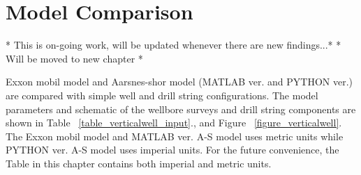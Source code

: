 %

\section{Model Comparison}

* This is on-going work, will be updated whenever there are new findings...*
* Will be moved to new chapter *

Exxon mobil model and Aarsnes-shor model (MATLAB ver. and PYTHON ver.) are compared with simple well and drill string configurations. The model parameters and schematic of the wellbore surveys and drill string components are shown in Table \tablename~\ref{table_verticalwell_input}., and Figure \figurename~\ref{figure_verticalwell}. The Exxon mobil model and MATLAB ver. A-S model uses metric units while PYTHON ver. A-S model uses imperial units. For the future convenience, the Table in this chapter contains both imperial and metric units.

